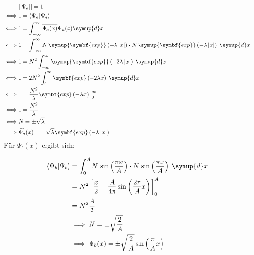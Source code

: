\begin{align*}
  &||\Psi_a|| = 1 \\
  \iff &1 = \left<\Psi_a|\Psi_a\right> \\
  \iff &1 = \int_{-\infty}^{\infty} \overline{\Psi_a(x)}\Psi_a(x)\symup{d}x \\
  \iff &1 = \int_{-\infty}^{\infty} N\, \symup{\symbf{exp}}\left(-\lambda \left|x\right|\right)\cdot N\, \symup{\symbf{exp}}\left(-\lambda \left|x\right|\right) \:\symup{d}x \\
  \iff &1 = N^2 \int_{-\infty}^{\infty} \symup{\symbf{exp}}\left(-2\lambda \left|x\right|\right) \:\symup{d}x  \\
  \iff &1 = 2 N^2 \int_{0}^{\infty} \symbf{exp}\left(-2\lambda x\right)\: \symup{d}x \\
  \iff &1 = \frac{N^2}{\lambda} \symbf{exp}\left(-\lambda x\right)\big |_0^\infty \\
  \iff &1 = \frac{N^2}{\lambda} \\
  \iff &N = \pm \sqrt{\lambda} \\
  \implies &\widehat{\Psi_a}(x) = \pm \sqrt{\lambda}\symbf{exp}\left(-\lambda \left|x\right|\right)
\end{align*}
Für $\Psi_b(x)$ ergibt sich:

\begin{align*}
  \left<\Psi_b|\Psi_b\right> &= \int_0^A N\, \sin \left(\frac{\pi x}{A}\right) \cdot N \, \sin \left(\frac{\pi x}{A}\right) \: \symup{d}x \\
  &= N^2 \left[\frac{x}{2}- \frac{A}{4\pi} \sin \left(\frac{2\pi}{A}x\right)\right]_0^A \\
  &= N^2 \frac{A}{2} \\
  &\implies N = \pm \sqrt{\frac{2}{A}}\\
  &\implies \Psi_b(x) = \pm \sqrt{\frac{2}{A}} \sin \left(\frac{\pi}{A} x\right)
\end{align*}

